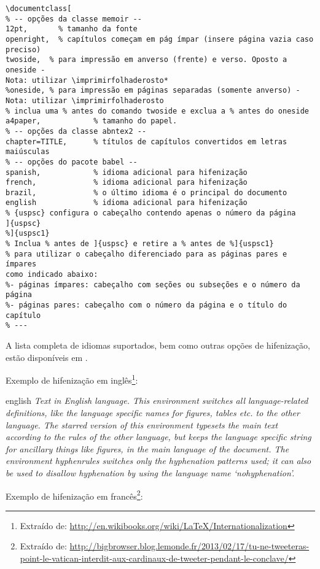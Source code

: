\begin{verbatim}
\documentclass[
% -- opções da classe memoir --
12pt,		% tamanho da fonte
openright,	% capítulos começam em pág ímpar (insere página vazia caso 
preciso)
twoside,  % para impressão em anverso (frente) e verso. Oposto a oneside - 
Nota: utilizar \imprimirfolhaderosto*
%oneside, % para impressão em páginas separadas (somente anverso) -  
Nota: utilizar \imprimirfolhaderosto
% inclua uma % antes do comando twoside e exclua a % antes do oneside 
a4paper,			% tamanho do papel. 
% -- opções da classe abntex2 --
chapter=TITLE,		% títulos de capítulos convertidos em letras 
maiúsculas
% -- opções do pacote babel --
spanish,			% idioma adicional para hifenização
french,				% idioma adicional para hifenização
brazil,				% o último idioma é o principal do documento
english 			% idioma adicional para hifenização
% {uspsc} configura o cabeçalho contendo apenas o número da página
]{uspsc}
%]{uspsc1}
% Inclua % antes de ]{uspsc} e retire a % antes de %]{uspsc1}
% para utilizar o cabeçalho diferenciado para as páginas pares e ímpares 
como indicado abaixo:
%- páginas ímpares: cabeçalho com seções ou subseções e o número da página
%- páginas pares: cabeçalho com o número da página e o título do capítulo 
% ---
\end{verbatim}

A lista completa de idiomas suportados, bem como outras opções de hifenização,
estão disponíveis em .

Exemplo de hifenização em inglês\footnote{Extraído de:
	\url{http://en.wikibooks.org/wiki/LaTeX/Internationalization}}:

\begin{otherlanguage*}{english}
	\textit{Text in English language. This environment switches all language-related
		definitions, like the language specific names for figures, tables etc. to the other
		language. The starred version of this environment typesets the main text
		according to the rules of the other language, but keeps the language specific
		string for ancillary things like figures, in the main language of the document.
		The environment hyphenrules switches only the hyphenation patterns used; it can
		also be used to disallow hyphenation by using the language name
		`nohyphenation'.}
\end{otherlanguage*}

Exemplo de hifenização em francês\footnote{Extraído de:
	\url{http://bigbrowser.blog.lemonde.fr/2013/02/17/tu-ne-tweeteras-point-le-vatican-interdit-aux-cardinaux-de-tweeter-pendant-le-conclave/}}:


